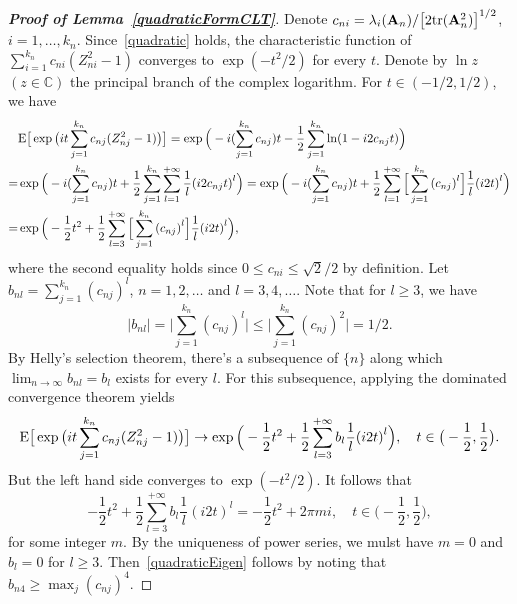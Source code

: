 \documentclass[times,sort&compress,3p]{elsarticle}
\newcommand{\mytr}{ {\rm tr} }
\newcommand{\myE}{ {\rm E} }
\newcommand{\BA}{\mathbf{A}}    \newcommand{\BB}{\mathbf{B}}    \newcommand{\BC}{\mathbf{C}}    \newcommand{\BD}{\mathbf{D}}    \newcommand{\BE}{\mathbf{E}}    \newcommand{\BF}{\mathbf{F}}    \newcommand{\BG}{\mathbf{G}}    \newcommand{\BH}{\mathbf{H}}    \newcommand{\BI}{\mathbf{I}}    \newcommand{\BJ}{\mathbf{J}}    \newcommand{\BK}{\mathbf{K}}    \newcommand{\BL}{\mathbf{L}}
\theoremstyle{plain}
\theoremstyle{definition}
\theoremstyle{remark}
\begin{document}
\begin{appendices}
\begin{proof}[\textbf{Proof of Lemma~\ref{quadraticFormCLT}}]
    Denote $c_{ni}=\lambda_i(\BA_n)/{\big[2\mytr(\BA_n^2)\big]}^{1/2}$, $i=1,\ldots,k_n$.
    Since~\ref{quadratic} holds, the characteristic function of
        $
        \sum_{i=1}^{k_n}c_{ni}(Z_{ni}^2-1)
    $
    converges to $\exp(-t^2/2)$ for every $t$.
    Denote by $\ln z$ $(z\in\mathbb{C})$ the principal branch of the complex logarithm.
    For $t\in (-1/2,1/2)$, we have
    \begin{equation*}
        \begin{aligned}
            &\myE\big[\exp{\big(it \sum_{j=1}^{k_n}c_{nj}(Z_{nj}^2-1)\big)}\big]
            =
            \exp\Big(-i(\sum_{j=1}^{k_n}c_{nj})t-
            \frac{1}{2}\sum_{j=1}^{k_n}\ln(1-i2c_{nj}t) \Big)\\
            =&
            \exp\Big(
            -i(\sum_{j=1}^{k_n}c_{nj})t+
            \frac{1}{2}\sum_{j=1}^{k_n}\sum_{l=1}^{+\infty}\frac{1}{l}{(i2c_{nj}t)}^l
            \Big)
            =
            \exp\Big(
            -i(\sum_{j=1}^{k_n}c_{nj})t+
            \frac{1}{2}\sum_{l=1}^{+\infty}\Big[\sum_{j=1}^{k_n}{(c_{nj})}^l\Big]\frac{1}{l}{(i2t)}^l\Big)\\
            =&
            \exp\Big(
            -\frac{1}{2}t^2+
            \frac{1}{2}\sum_{l=3}^{+\infty}\Big[\sum_{j=1}^{k_n}{(c_{nj})}^l\Big]\frac{1}{l}{(i2t)}^l \Big),
        \end{aligned}
    \end{equation*}
    where the second equality holds since $0\leq c_{ni}\leq \sqrt{2}/2$ by definition.
    Let $b_{nl}=\sum_{j=1}^{k_n}{(c_{nj})}^l$, $n=1,2,\ldots$ and $l=3,4,\ldots$.
    Note that for $l\geq 3$, we have
    $$|b_{nl}|=\big|\sum_{j=1}^{k_n}{(c_{nj})}^l\big|\leq \big|\sum_{j=1}^{k_n}{(c_{nj})}^2\big|=1/2.$$
    By Helly's selection theorem, there's a subsequence of $\{n\}$ along which $\lim_{n\to \infty}b_{nl}=b_l$ exists for every $l$.
    For this subsequence, applying the dominated convergence theorem yields
            $$\myE \big[\exp{\big(it \sum_{j=1}^{k_n}c_{nj}(Z_{nj}^2-1)\big)}\big]
            \to
            \exp\Big(
            -\frac{1}{2}t^2+
            \frac{1}{2}\sum_{l=3}^{+\infty}b_l\frac{1}{l}{(i2t)}^l\Big),
            \quad t\in\big(-\frac{1}{2},\frac{1}{2}\big).
            $$
            But the left hand side converges to $\exp(-t^2/2)$.
            It follows that
            $$
            -\frac{1}{2}t^2+
            \frac{1}{2}\sum_{l=3}^{+\infty}b_l\frac{1}{l}{(i2t)}^l
            =-\frac{1}{2}t^2+ 2\pi m i,
            \quad t\in\big(-\frac{1}{2},\frac{1}{2}\big),
            $$
            for some integer $m$.
            By the uniqueness of power series, we mulst have $m=0$ and $b_l=0$ for $l\geq 3$. Then~\ref{quadraticEigen} follows by noting that $b_{n4}\geq \max_j{(c_{nj})}^4$.
\end{proof}






\end{appendices}
\end{document}
